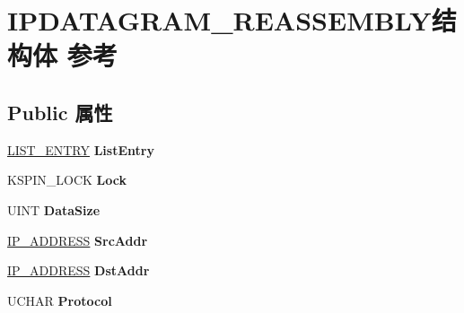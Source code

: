 \hypertarget{struct_i_p_d_a_t_a_g_r_a_m___r_e_a_s_s_e_m_b_l_y}{}\section{I\+P\+D\+A\+T\+A\+G\+R\+A\+M\+\_\+\+R\+E\+A\+S\+S\+E\+M\+B\+L\+Y结构体 参考}
\label{struct_i_p_d_a_t_a_g_r_a_m___r_e_a_s_s_e_m_b_l_y}
\subsection*{Public 属性}
\begin{DoxyCompactItemize}
\item 
\mbox{\label{struct_i_p_d_a_t_a_g_r_a_m___r_e_a_s_s_e_m_b_l_y_af6437e93eacdcd9186cf8ebe54e23353}} 
\hyperlink{struct___l_i_s_t___e_n_t_r_y}{L\+I\+S\+T\+\_\+\+E\+N\+T\+RY} {\bfseries List\+Entry}
\item 
\mbox{\label{struct_i_p_d_a_t_a_g_r_a_m___r_e_a_s_s_e_m_b_l_y_ab770b251d9b2cc18ff038200bd711d50}} 
K\+S\+P\+I\+N\+\_\+\+L\+O\+CK {\bfseries Lock}
\item 
\mbox{\label{struct_i_p_d_a_t_a_g_r_a_m___r_e_a_s_s_e_m_b_l_y_a50f0d7653000befe233bfd050c5e0c1d}} 
U\+I\+NT {\bfseries Data\+Size}
\item 
\mbox{\label{struct_i_p_d_a_t_a_g_r_a_m___r_e_a_s_s_e_m_b_l_y_a22672977d2c409dda9b92b235444bacb}} 
\hyperlink{struct_i_p___a_d_d_r_e_s_s}{I\+P\+\_\+\+A\+D\+D\+R\+E\+SS} {\bfseries Src\+Addr}
\item 
\mbox{\label{struct_i_p_d_a_t_a_g_r_a_m___r_e_a_s_s_e_m_b_l_y_a8adfc9e0c018cdea1d9ac3d51ab4c6b5}} 
\hyperlink{struct_i_p___a_d_d_r_e_s_s}{I\+P\+\_\+\+A\+D\+D\+R\+E\+SS} {\bfseries Dst\+Addr}
\item 
\mbox{\label{struct_i_p_d_a_t_a_g_r_a_m___r_e_a_s_s_e_m_b_l_y_aea47b27c1738cb734a7b789f31139b30}} 
U\+C\+H\+AR {\bfseries Protocol}
\item 

\end{DoxyCompactItemize}
